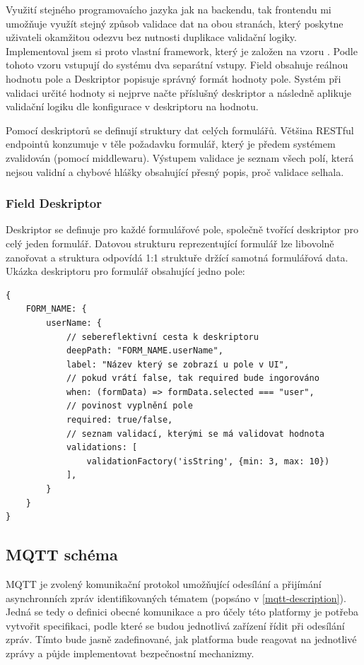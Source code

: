 Využití stejného programovaícho jazyka jak na backendu, tak frontendu mi umožňuje využít stejný způsob validace dat na obou stranách, který poskytne uživateli okamžitou odezvu bez nutnosti duplikace validační logiky. Implementoval jsem si proto vlastní framework, který je založen na vzoru  \cite{field-descriptor-pattern}. Podle tohoto vzoru vstupují do systému dva separátní vstupy. Field obsahuje reálnou hodnotu pole a Deskriptor popisuje správný formát hodnoty pole. Systém při validaci určité hodnoty si nejprve načte příslušný deskriptor a následně aplikuje validační logiku dle konfigurace v deskriptoru na hodnotu.

Pomocí deskriptorů se definují struktury dat celých formulářů. Většina RESTful endpointů konzumuje v těle požadavku formulář, který je předem systémem zvalidován (pomocí middlewaru). Výstupem validace je seznam všech polí, která nejsou validní a chybové hlášky obsahující přesný popis, proč validace selhala.

\subsubsection{Field Deskriptor}
Deskriptor se definuje pro každé formulářové pole, společně tvořící deskriptor pro celý jeden formulář. Datovou strukturu reprezentující formulář lze libovolně zanořovat a struktura odpovídá 1:1 struktuře držící samotná formulářová data. Ukázka deskriptoru pro formulář obsahující jedno pole:

\begin{verbatim}
{
    FORM_NAME: {
        userName: {
            // sebereflektivní cesta k deskriptoru
            deepPath: "FORM_NAME.userName",        
            label: "Název který se zobrazí u pole v UI",
            // pokud vrátí false, tak required bude ingorováno
            when: (formData) => formData.selected === "user", 
            // povinost vyplnění pole 
            required: true/false,
            // seznam validací, kterými se má validovat hodnota
            validations: [
                validationFactory('isString', {min: 3, max: 10})
            ],   
        }
    }
}
\end{verbatim}


\subsection{MQTT schéma}
MQTT je zvolený komunikační protokol umožňující odesílání a přijímání asynchronních zpráv identifikovaných tématem (popsáno v \ref{mqtt-description}). Jedná se tedy o definici obecné komunikace a pro účely této platformy je potřeba vytvořit specifikaci, podle které se budou jednotlivá zařízení řídit při odesílání zpráv. Tímto bude jasně zadefinované, jak platforma bude reagovat na jednotlivé zprávy a půjde implementovat bezpečnostní mechanizmy.

